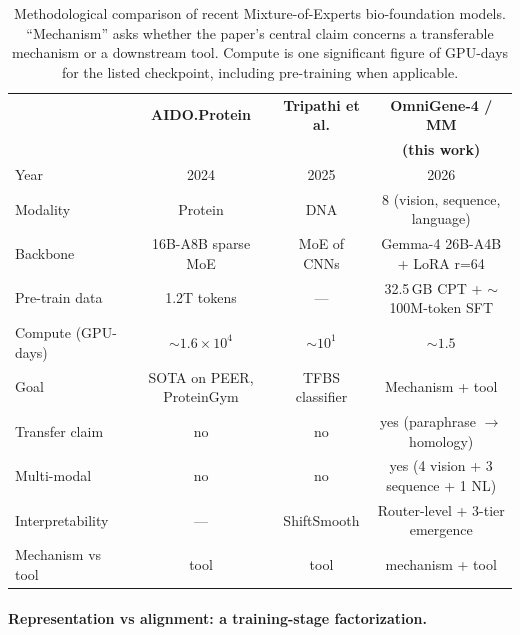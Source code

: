 \documentclass[11pt]{article}
\begin{document}
\begin{table}[t]
\centering
\small
\caption{Methodological comparison of recent Mixture-of-Experts bio-foundation models. ``Mechanism'' asks whether the paper's central claim concerns a transferable mechanism or a downstream tool. Compute is one significant figure of GPU-days for the listed checkpoint, including pre-training when applicable.}
\label{tab:t3-methodology}
\renewcommand{\arraystretch}{1.18}
\begin{tabular}{l c c c}
\toprule
& \textbf{AIDO.Protein} & \textbf{Tripathi et al.} & \textbf{OmniGene-4 / MM} \\
& \citep{sun2024aido} & \citep{tripathi2025tfbs} & \textbf{(this work)} \\
\midrule
Year                            & 2024            & 2025                & 2026 \\
Modality                        & Protein         & DNA                 & 8 (vision, sequence, language) \\
Backbone                        & 16B-A8B sparse MoE & MoE of CNNs       & Gemma-4 26B-A4B + LoRA r=64 \\
Pre-train data                  & 1.2T tokens     & ---                 & 32.5\,GB CPT + $\sim$100M-token SFT \\
Compute (GPU-days)              & $\sim 1.6{\times}10^{4}$ & $\sim 10^{1}$ & $\sim 1.5$ \\
Goal                            & SOTA on PEER, ProteinGym & TFBS classifier & Mechanism + tool \\
Transfer claim                  & no              & no                  & yes (paraphrase $\rightarrow$ homology) \\
Multi-modal                     & no              & no                  & yes (4 vision + 3 sequence + 1 NL) \\
Interpretability                & ---             & ShiftSmooth         & Router-level + 3-tier emergence \\
Mechanism vs tool               & tool            & tool                & mechanism + tool \\
\bottomrule
\end{tabular}
\end{table}

\paragraph{Representation vs alignment: a training-stage factorization.}
\end{document}
